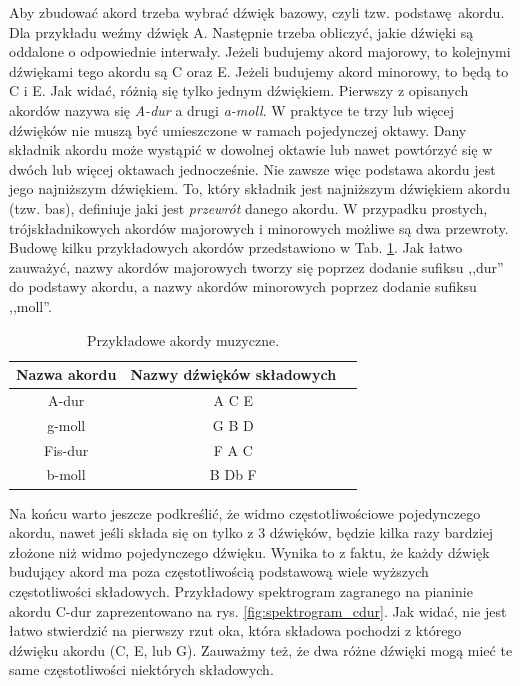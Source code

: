 Aby zbudować akord trzeba wybrać dźwięk bazowy, czyli tzw. podstawę akordu. Dla przykładu weźmy dźwięk A. Następnie trzeba obliczyć, jakie dźwięki są oddalone o odpowiednie interwały. Jeżeli budujemy akord majorowy, to kolejnymi dźwiękami tego akordu są C\sh{} oraz E. Jeżeli budujemy akord minorowy, to będą to C i E. Jak widać, różnią się tylko jednym dźwiękiem. Pierwszy z opisanych akordów nazywa się \emph{A-dur} a drugi \emph{a-moll}. W praktyce te trzy lub więcej dźwięków nie muszą być umieszczone w ramach pojedynczej oktawy. Dany składnik akordu może wystąpić w dowolnej oktawie lub nawet powtórzyć się w dwóch lub więcej oktawach jednocześnie. Nie zawsze więc podstawa akordu jest jego najniższym dźwiękiem. To, który składnik jest najniższym dźwiękiem akordu (tzw. bas), definiuje jaki jest \emph{przewrót} danego akordu. W przypadku prostych, trójskładnikowych akordów majorowych i minorowych możliwe są dwa przewroty. Budowę kilku przykładowych akordów przedstawiono w Tab. \ref{tab:przykladowe_akordy}. Jak łatwo zauważyć, nazwy akordów majorowych tworzy się poprzez dodanie sufiksu ,,dur'' do podstawy akordu, a nazwy akordów minorowych poprzez dodanie sufiksu ,,moll''.

\begin{table}[htb]
    \centering
    \caption{Przykładowe akordy muzyczne.}
    \label{tab:przykladowe_akordy}
    \begin{tabular}{|c|c|c|} \hline
        Nazwa akordu & Nazwy dźwięków składowych \\ \hline
        A-dur   & A  C\sh{} E  \\
        g-moll  & G  B  D  \\
        Fis-dur  & F\sh{} A\sh{} C\sh{} \\
        b-moll  & B  Db F  \\ \hline
    \end{tabular}
\end{table}

Na końcu warto jeszcze podkreślić, że widmo częstotliwościowe pojedynczego akordu, nawet jeśli składa się on tylko z $3$ dźwięków, będzie kilka razy bardziej złożone niż widmo pojedynczego dźwięku. Wynika to z faktu, że każdy dźwięk budujący akord ma poza częstotliwością podstawową wiele wyższych częstotliwości składowych. Przykładowy spektrogram zagranego na pianinie akordu C-dur zaprezentowano na rys. \ref{fig:spektrogram_cdur}. Jak widać, nie jest łatwo stwierdzić na pierwszy rzut oka, która składowa pochodzi z którego dźwięku akordu (C, E, lub G). Zauważmy też, że dwa różne dźwięki mogą mieć te same częstotliwości niektórych składowych.

